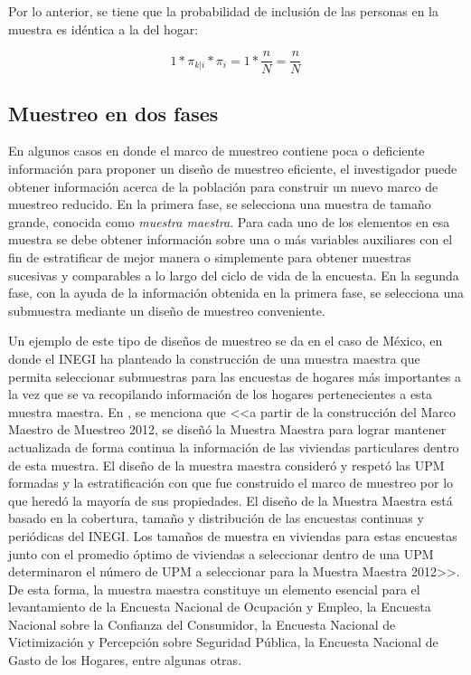 \documentclass[12pt,spanish,]{book}
\begin{document}
Por lo anterior, se tiene que la probabilidad de inclusión de las personas en la muestra es idéntica a la del hogar:

\[1 * \pi_{k|i} * \pi_i = 1 * \frac{n}{N} = \frac{n}{N}\]

\hypertarget{muestreo-en-dos-fases}{%
\subsection*{Muestreo en dos fases}\label{muestreo-en-dos-fases}}

En algunos casos en donde el marco de muestreo contiene poca o deficiente información para proponer un diseño de muestreo eficiente, el investigador puede obtener información acerca de la población para construir un nuevo marco de muestreo reducido. En la primera fase, se selecciona una muestra de tamaño grande, conocida como \emph{muestra maestra}. Para cada uno de los elementos en esa muestra se debe obtener información sobre una o más variables auxiliares con el fin de estratificar de mejor manera o simplemente para obtener muestras sucesivas y comparables a lo largo del ciclo de vida de la encuesta. En la segunda fase, con la ayuda de la información obtenida en la primera fase, se selecciona una submuestra mediante un diseño de muestreo conveniente.

Un ejemplo de este tipo de diseños de muestreo se da en el caso de México, en donde el INEGI ha planteado la construcción de una muestra maestra que permita seleccionar submuestras para las encuestas de hogares más importantes a la vez que se va recopilando información de los hogares pertenecientes a esta muestra maestra. En \textcite{INEGI_MX_2012}, se menciona que \textless{}\textless{}a partir de la construcción del Marco Maestro de Muestreo 2012, se diseñó la Muestra Maestra para lograr mantener actualizada de forma continua la información de las viviendas particulares dentro de esta muestra. El diseño de la muestra maestra consideró y respetó las UPM formadas y la estratificación con que fue construido el marco de muestreo por lo que heredó la mayoría de sus propiedades. El diseño de la Muestra Maestra está basado en la cobertura, tamaño y distribución de las encuestas continuas y periódicas del INEGI. Los tamaños de muestra en viviendas para estas encuestas junto con el promedio óptimo de viviendas a seleccionar dentro de una UPM determinaron el número de UPM a seleccionar para la Muestra Maestra 2012\textgreater{}\textgreater{}. De esta forma, la muestra maestra constituye un elemento esencial para el levantamiento de la Encuesta Nacional de Ocupación y Empleo, la Encuesta Nacional sobre la Confianza del Consumidor, la Encuesta Nacional de Victimización y Percepción sobre Seguridad Pública, la Encuesta Nacional de Gasto de los Hogares, entre algunas otras.
\end{document}
